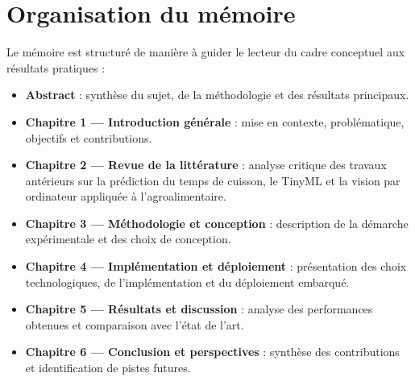 \section{Organisation du mémoire}
Le mémoire est structuré de manière à guider le lecteur du cadre conceptuel aux résultats pratiques :
\begin{itemize}
    \item \textbf{Abstract} : synthèse du sujet, de la méthodologie et des résultats principaux.
    \item \textbf{Chapitre 1 — Introduction générale} : mise en contexte, problématique, objectifs et contributions.
    \item \textbf{Chapitre 2 — Revue de la littérature} : analyse critique des travaux antérieurs sur la prédiction du temps de cuisson, le TinyML et la vision par ordinateur appliquée à l’agroalimentaire.
    \item \textbf{Chapitre 3 — Méthodologie et conception} : description de la démarche expérimentale et des choix de conception.
    \item \textbf{Chapitre 4 — Implémentation et déploiement} : présentation des choix technologiques, de l’implémentation et du déploiement embarqué.
    \item \textbf{Chapitre 5 — Résultats et discussion} : analyse des performances obtenues et comparaison avec l’état de l’art.
    \item \textbf{Chapitre 6 — Conclusion et perspectives} : synthèse des contributions et identification de pistes futures.
\end{itemize}
